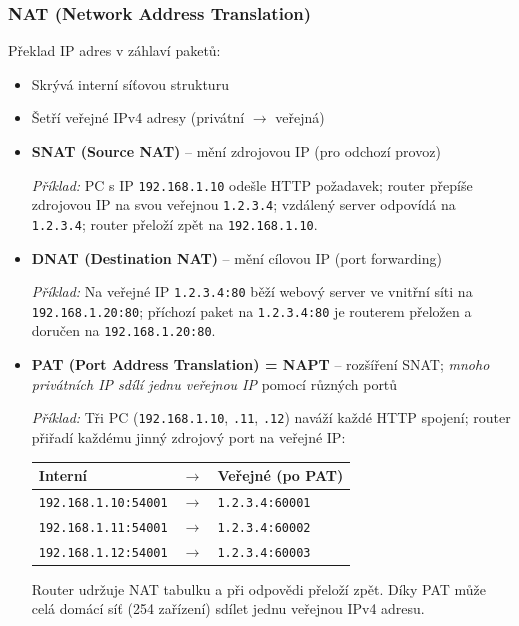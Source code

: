 \subsubsection{NAT (Network Address Translation)}

Překlad IP adres v záhlaví paketů:
\begin{itemize}
  \item Skrývá interní síťovou strukturu
  \item Šetří veřejné IPv4 adresy (privátní $\to$ veřejná)
  \item \textbf{SNAT (Source NAT)} -- mění zdrojovou IP (pro odchozí provoz)

    \textit{Příklad:} PC s IP \texttt{192.168.1.10} odešle HTTP požadavek; router přepíše zdrojovou IP na svou veřejnou \texttt{1.2.3.4}; vzdálený server odpovídá na \texttt{1.2.3.4}; router přeloží zpět na \texttt{192.168.1.10}.

  \item \textbf{DNAT (Destination NAT)} -- mění cílovou IP (port forwarding)

    \textit{Příklad:} Na veřejné IP \texttt{1.2.3.4:80} běží webový server ve vnitřní síti na \texttt{192.168.1.20:80}; příchozí paket na \texttt{1.2.3.4:80} je routerem přeložen a doručen na \texttt{192.168.1.20:80}.

  \item \textbf{PAT (Port Address Translation) = NAPT} -- rozšíření SNAT; \textit{mnoho privátních IP sdílí jednu veřejnou IP} pomocí různých portů

    \textit{Příklad:} Tři PC (\texttt{192.168.1.10}, \texttt{.11}, \texttt{.12}) naváží každé HTTP spojení; router přiřadí každému jinný zdrojový port na veřejné IP:
    \begin{center}\footnotesize
    \begin{tabular}{lll}
    \toprule
    \textbf{Interní} & \textbf{$\to$} & \textbf{Veřejné (po PAT)} \\
    \midrule
    \texttt{192.168.1.10:54001} & $\to$ & \texttt{1.2.3.4:60001} \\
    \texttt{192.168.1.11:54001} & $\to$ & \texttt{1.2.3.4:60002} \\
    \texttt{192.168.1.12:54001} & $\to$ & \texttt{1.2.3.4:60003} \\
    \bottomrule
    \end{tabular}
    \end{center}
    Router udržuje NAT tabulku a při odpovědi přeloží zpět. Díky PAT může celá domácí síť (254 zařízení) sdílet jednu veřejnou IPv4 adresu.
\end{itemize}

